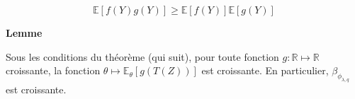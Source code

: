 \documentclass[12pt]{article}
\newif\ifcorrection
\newcommand{\corr}[1]{\ifcorrection{\color{lightblue}#1\color{black}}\fi}
\newcommand{\petitespace}{\vspace{0.5cm}}
\newcommand{\bb}[1]{\mathbb{#1}} %
\newcommand{\R}{\bb{R}} %
\renewcommand{\cal}{\mathcal}
\newcommand{\esp}[1]{\bb{ E} \mathopen{}\left[#1\right]} %
\newcommand{\cov}{\text{Cov}}
\newcommand{\esptheta}[1]{\bb{E}_\theta[#1]}
\newcommand{\1}{\bb{1}} %
\begin{document}
$$\esp{f(Y)g(Y)} \ge \esp{f(Y)}\esp{g(Y)} $$

\petitespace

\corr{\textbf{Preuve :}

Soit $Y'$ une variable aléatoire indépendante de $Y$ et de même loi. 

En distinguant les cas $Y \leq Y'$ et $Y > Y'$, grâce à la croissance de $f$ et $g$ on prouve facilement l'inégalité :
        \[(f(Y) - f(Y'))(g(Y) - g(Y')) \geq 0\]

D'où


\begin{align*}
	0& \le \esp{(f(Y)- f(Y'))(g(Y) - g(Y'))}\\
	& = \esp{f(Y)g(Y)} + \esp{f(Y')g(Y')} -\esp{f(Y)g(Y')} - \esp{f(Y')g(Y)}\\
	&= 2(\esp{f(Y)g(Y)}-\esp{f(Y)}\esp{g(Y)})
\end{align*}

Ce qui démontre le résultat. (équivalent à dire que $\cov(f(Y),g(Y)) \ge 0$)
\petitespace}


\textbf{Lemme}

Sous les conditions du théorème (qui suit), pour toute fonction $g : \R \mapsto \R$ croissante, la fonction $\theta \mapsto \esptheta{g(T(Z))}$ est croissante. En particulier, $\beta_{\phi_{\lambda, q}}$ est croissante.

\petitespace

\corr{\textbf{Preuve :}

Soient $ \theta_0 < \theta_1$, on a 

\begin{align*}
	\bb{E}_{\theta_1}[g(T(Z))] &= \int_{\cal Z}g(T(z))p_{\theta_1}(z)d\mu(z)\\
	&= \int_{\cal Z}g(T(z))\frac{p_{\theta_1}(z)}{p_{\theta_0}(z)}p_{\theta_0}(z)d\mu(z)\\
	&=\bb{E}_{\theta_0}[g(T(Z))\frac{p_{\theta_1}(Z)}{p_{\theta_0}(Z)}]\\
	&= \bb{E}_{\theta_0}[g(T(Z))\Psi_{\theta_0, \theta_1}(T(Z))]\\
	\text{(Lemme)}&\ge   \bb{E}_{\theta_0}[g(T(Z))]\bb{E}_{\theta_0}[ \Psi_{\theta_0, \theta_1}(T(Z))]\\
\end{align*}

Or 

$$ \bb{E}_{\theta_0}[ \Psi_{\theta_0, \theta_1}(T(Z))] = \int_{\cal Z}\frac{p_{\theta_1}(z)}{p_{\theta_0}(z)}p_{\theta_0}(z)d\mu(z) = 1$$

Donc $\bb{E}_{\theta_1}[g(T(Z))] \ge \bb{E}_{\theta_0}[g(T(Z))]$, d'où la croissance de $\theta \mapsto \esptheta{g(T(Z))}$.

Pour la deuxième assertion, on note $\phi_{\lambda,q}(Z)= g_{\lambda,q}(T(Z))$, où $ g_{\lambda,q}(t) = \1_{\{t>\lambda \}} + q\1_{\{ t=\lambda \}}$ croissante
\petitespace}
\end{document}
